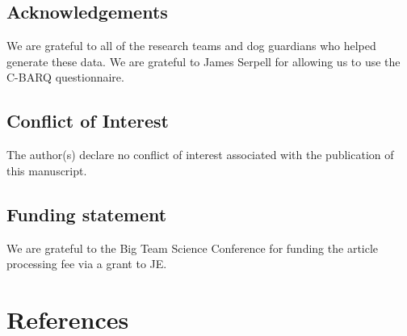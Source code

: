 \documentclass[
  pub,floatsintext]{apa6}
\begin{document}
\hypertarget{acknowledgements}{%
\subsection{Acknowledgements}\label{acknowledgements}}

We are grateful to all of the research teams and dog guardians who helped generate these data. We are grateful to James Serpell for allowing us to use the C-BARQ questionnaire.

\hypertarget{conflict-of-interest}{%
\subsection{Conflict of Interest}\label{conflict-of-interest}}

The author(s) declare no conflict of interest associated with the publication of this manuscript.

\hypertarget{funding-statement}{%
\subsection{Funding statement}\label{funding-statement}}

We are grateful to the Big Team Science Conference for funding the article processing fee via a grant to JE.

\hypertarget{references}{%
\section{References}\label{references}}

\scriptsize
\end{document}
